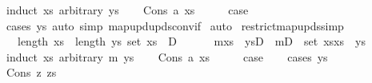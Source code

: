 \begin{isabellebody}
%
\isadelimproof
%
\endisadelimproof
%
\isatagproof
{}\isamarkupfalse%
\ {\isacharparenleft}{\kern0pt}induct\ xs\ arbitrary{\isacharcolon}{\kern0pt}\ ys{\isacharparenright}{\kern0pt}\isanewline
\ \ \isamarkupfalse%
\ {\isacharparenleft}{\kern0pt}Cons\ a\ xs{\isacharparenright}{\kern0pt}\isanewline
\ \ \isamarkupfalse%
\ \isamarkupfalse%
\ {\isacharquery}{\kern0pt}case\isanewline
\ \ \ \ \isamarkupfalse%
\ {\isacharparenleft}{\kern0pt}cases\ ys{\isacharparenright}{\kern0pt}\ {\isacharparenleft}{\kern0pt}auto\ simp{\isacharcolon}{\kern0pt}\ map{\isacharunderscore}{\kern0pt}upd{\isacharunderscore}{\kern0pt}upds{\isacharunderscore}{\kern0pt}conv{\isacharunderscore}{\kern0pt}if{\isacharparenright}{\kern0pt}\isanewline
{}\isamarkupfalse%
\ auto%
\endisatagproof
{\isafoldproof}%
%
\isadelimproof
\isanewline
%
\endisadelimproof
\isanewline
{}\isamarkupfalse%
\ restrict{\isacharunderscore}{\kern0pt}map{\isacharunderscore}{\kern0pt}upds{\isacharbrackleft}{\kern0pt}simp{\isacharbrackright}{\kern0pt}{\isacharcolon}{\kern0pt}\isanewline
\ \ {\isachardoublequoteopen}{\isasymlbrakk}\ length\ xs\ {\isacharequal}{\kern0pt}\ length\ ys{\isacharsemicolon}{\kern0pt}\ set\ xs\ {\isasymsubseteq}\ D\ {\isasymrbrakk}\isanewline
\ \ \ \ {\isasymLongrightarrow}\ m{\isacharparenleft}{\kern0pt}xs\ {\isacharbrackleft}{\kern0pt}{\isasymmapsto}{\isacharbrackright}{\kern0pt}\ ys{\isacharparenright}{\kern0pt}{\isacharbar}{\kern0pt}{\isacharbackquote}{\kern0pt}D\ {\isacharequal}{\kern0pt}\ {\isacharparenleft}{\kern0pt}m{\isacharbar}{\kern0pt}{\isacharbackquote}{\kern0pt}{\isacharparenleft}{\kern0pt}D\ {\isacharminus}{\kern0pt}\ set\ xs{\isacharparenright}{\kern0pt}{\isacharparenright}{\kern0pt}{\isacharparenleft}{\kern0pt}xs\ {\isacharbrackleft}{\kern0pt}{\isasymmapsto}{\isacharbrackright}{\kern0pt}\ ys{\isacharparenright}{\kern0pt}{\isachardoublequoteclose}\isanewline
%
\isadelimproof
%
\endisadelimproof
%
\isatagproof
{}\isamarkupfalse%
\ {\isacharparenleft}{\kern0pt}induct\ xs\ arbitrary{\isacharcolon}{\kern0pt}\ m\ ys{\isacharparenright}{\kern0pt}\isanewline
\ \ \isamarkupfalse%
\ {\isacharparenleft}{\kern0pt}Cons\ a\ xs{\isacharparenright}{\kern0pt}\isanewline
\ \ \isamarkupfalse%
\ \isamarkupfalse%
\ {\isacharquery}{\kern0pt}case\isanewline
\ \ \isamarkupfalse%
\ {\isacharparenleft}{\kern0pt}cases\ ys{\isacharparenright}{\kern0pt}\isanewline
\ \ \ \ \isamarkupfalse%
\ {\isacharparenleft}{\kern0pt}Cons\ z\ zs{\isacharparenright}{\kern0pt}\isanewline

\end{isabellebody}
